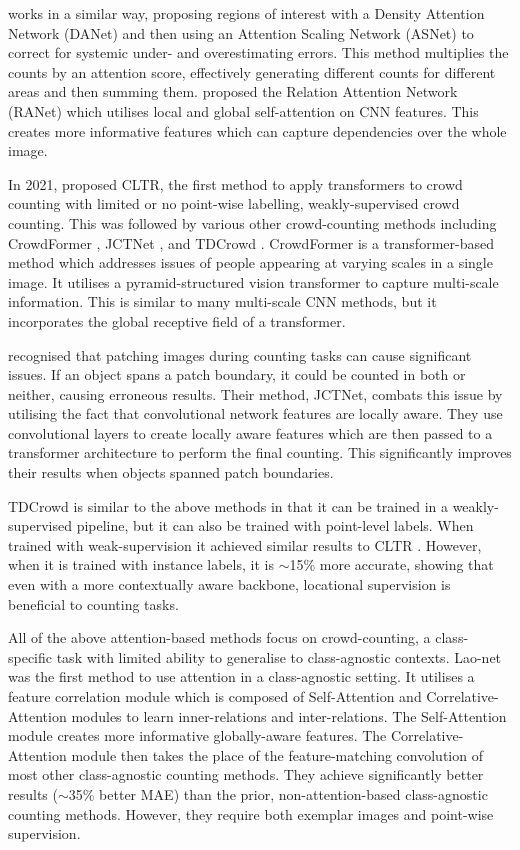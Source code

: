 \documentclass[../thesis.tex]{subfiles}
\begin{document}
\citet{jiang2020attention} works in a similar way, proposing regions of interest with a Density Attention Network (DANet) and then using an Attention Scaling Network (ASNet) to correct for systemic under- and overestimating errors. This method multiplies the counts by an attention score, effectively generating different counts for different areas and then summing them.
\citet{zhang2019attentional} proposed the Relation Attention Network (RANet) which utilises local and global self-attention on CNN features. This creates more informative features which can capture dependencies over the whole image. 


In 2021, \citet{liang2021transcrowd} proposed CLTR, the first method to apply transformers to crowd counting with limited or no point-wise labelling, \ie weakly-supervised crowd counting.
This was followed by various other crowd-counting methods including CrowdFormer \cite{savner2022crowdformer}, JCTNet \cite{wang2022joint}, and TDCrowd \cite{do2021attention}.
CrowdFormer \cite{savner2022crowdformer} is a transformer-based method which addresses issues of people appearing at varying scales in a single image. 
It utilises a pyramid-structured vision transformer to capture multi-scale information. This is similar to many multi-scale  CNN methods, but it incorporates the global receptive field of a transformer.

\citet{wang2022joint} recognised that patching images during counting tasks can cause significant issues. If an object spans a patch boundary, it could be counted in both or neither, causing erroneous results. 
Their method, JCTNet, combats this issue by utilising the fact that convolutional network features are locally aware. They use convolutional layers to create locally aware features which are then passed to a transformer architecture to perform the final counting. This significantly improves their results when objects spanned patch boundaries.

TDCrowd \cite{do2021attention} is similar to the above methods in that it can be trained in a weakly-supervised pipeline, but it can also be trained with point-level labels. When trained with weak-supervision it achieved similar results to CLTR \cite{liang2021transcrowd}. However, when it is trained with instance labels, it is  $\sim$15\% more accurate, showing that even with a more contextually aware backbone, locational supervision is beneficial to counting tasks.

All of the above attention-based methods focus on crowd-counting, a class-specific task with limited ability to generalise to class-agnostic contexts.
Lao-net \cite{lin2021object} was the first method to use attention in a class-agnostic setting. It utilises a feature correlation module which is composed of Self-Attention and Correlative-Attention modules to learn inner-relations and inter-relations. The Self-Attention module creates more informative globally-aware features. The Correlative-Attention module then takes the place of the feature-matching convolution of most other class-agnostic counting methods. They achieve significantly better results ($\sim$35\% better MAE) than the prior, non-attention-based class-agnostic counting methods. However, they require both exemplar images and point-wise supervision.
\end{document}
